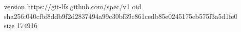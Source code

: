 version https://git-lfs.github.com/spec/v1
oid sha256:040cfbf8ddb9f2d2837494a99c30bf39c861cedb85e0245175eb575f3a5d1fe0
size 174916
